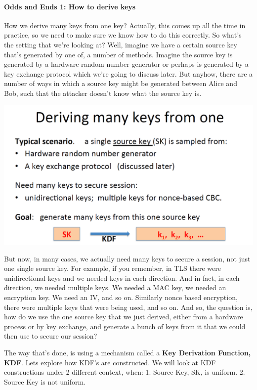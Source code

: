 \documentclass[11pt]{article}
\makeatletter
\def\maxwidth{\ifdim\Gin@nat@width>\linewidth\linewidth
    \else\Gin@nat@width\fi}
\let\Oldincludegraphics\includegraphics
\renewcommand{\includegraphics}[1]{\Oldincludegraphics[width=.8\maxwidth]{#1}}
\makeatother
\begin{document}
\hypertarget{odds-and-ends-1-how-to-derive-keys}{%
\paragraph{Odds and Ends 1: How to derive
keys}\label{odds-and-ends-1-how-to-derive-keys}}

How we derive many keys from one key? Actually, this comes up all the
time in practice, so we need to make sure we know how to do this
correctly. So what's the setting that we're looking at? Well, imagine we
have a certain source key that's generated by one of, a number of
methods. Imagine the source key is generated by a hardware random number
generator or perhaps is generated by a key exchange protocol which we're
going to discuss later. But anyhow, there are a number of ways in which
a source key might be generated between Alice and Bob, such that the
attacker doesn't know what the source key is.

\includegraphics{./Images/DerivingManyKfrom1.png}

But now, in many cases, we actually need many keys to secure a session,
not just one single source key. For example, if you remember, in TLS
there were unidirectional keys and we needed keys in each direction. And
in fact, in each direction, we needed multiple keys. We needed a MAC
key, we needed an encryption key. We need an IV, and so on. Similarly
nonce based encryption, there were multiple keys that were being used,
and so on. And so, the question is, how do we use the one source key
that we just derived, either from a hardware process or by key exchange,
and generate a bunch of keys from it that we could then use to secure
our session?

The way that's done, is using a mechanism called a \textbf{Key
Derivation Function, KDF}. Lets explore how KDF's are constructed. We
will look at KDF constructions under 2 different context, when: 1.
Source Key, SK, is uniform. 2. Source Key is not uniform.
\end{document}
